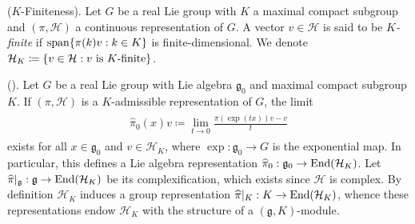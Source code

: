 \noindent\begin{definition}\textup{($K$-Finiteness).} Let $G$ be a real Lie group with $K$ a maximal compact subgroup and $(\pi, \mathcal{H})$ a continuous representation of $G$. A vector $v \in \mathcal{H}$ is said to be {\em $K$-finite} if $\textup{span}\{\pi(k)v : k \in K\}$ is finite-dimensional. We denote $\mathcal{H}_K \coloneqq \{v \in \mathcal{H} : \textup{$v$ is $K$-finite}\}$.\\
\end{definition}

\noindent\begin{theorem}\textup{(\cite[Theorem 0.3.5]{Vog81}).}\label{ContinuousgKForward} Let $G$ be a real Lie group with Lie algebra $\mathfrak{g}_0$ and maximal compact subgroup $K$. If $(\pi, \mathcal{H})$ is a $K$-admissible representation of $G$, the limit
\begin{align*}
\begin{split}
\widehat{\pi}_0(x)v \coloneqq \lim_{t\to 0}\frac{\pi(\exp(tx))v - v}{t}
\end{split}
\end{align*}
exists for all $x \in \mathfrak{g}_0$ and $v \in \mathcal{H}_K$, where $\exp : \mathfrak{g}_0 \to G$ is the exponential map. In particular, this defines a Lie algebra representation $\widehat{\pi}_0 : \mathfrak{g}_0 \to \textup{End}(\mathcal{H}_K)$. Let $\widehat{\pi}\vert_\mathfrak{g} : \mathfrak{g} \to \textup{End}(\mathcal{H}_K)$ be its complexification, which exists since $\mathcal{H}$ is complex. By definition $\mathcal{H}_K$ induces a group representation $\widehat{\pi}\vert_K : K \to \textup{End}(\mathcal{H}_K)$, whence these representations endow $\mathcal{H}_K$ with the structure of a $(\mathfrak{g}, K)$-module.\\
\end{theorem}

